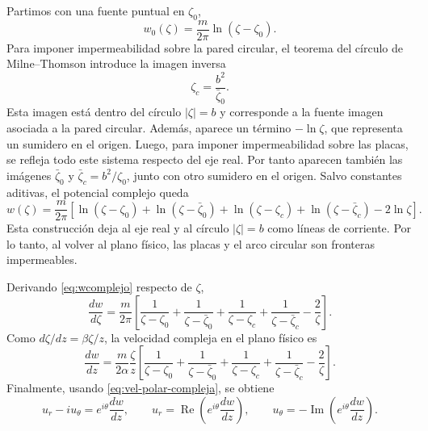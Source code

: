 \documentclass[11pt]{article}
\begin{document}
Partimos con una fuente puntual en $\zeta_0$,
\[
w_0(\zeta)=\frac{m}{2\pi}\ln(\zeta-\zeta_0).
\]
Para imponer impermeabilidad sobre la pared circular, el teorema del círculo de Milne--Thomson introduce la imagen inversa
\begin{equation}
\zeta_c=\frac{b^2}{\bar\zeta_0}.
\label{eq:imagen-circular-p3}
\end{equation}
Esta imagen está dentro del círculo $|\zeta|=b$ y corresponde a la fuente imagen asociada a la pared circular. Además, aparece un término $-\ln\zeta$, que representa un sumidero en el origen. Luego, para imponer impermeabilidad sobre las placas, se refleja todo este sistema respecto del eje real. Por tanto aparecen también las imágenes $\bar\zeta_0$ y $\bar\zeta_c=b^2/\zeta_0$, junto con otro sumidero en el origen. Salvo constantes aditivas, el potencial complejo queda
\begin{equation}
w(\zeta)=\frac{m}{2\pi}\left[
\ln(\zeta-\zeta_0)+\ln(\zeta-\bar\zeta_0)
+\ln(\zeta-\zeta_c)+\ln(\zeta-\bar\zeta_c)
-2\ln\zeta\right].
\label{eq:wcomplejo}
\end{equation}
Esta construcción deja al eje real y al círculo $|\zeta|=b$ como líneas de corriente. Por lo tanto, al volver al plano físico, las placas y el arco circular son fronteras impermeables.

Derivando \eqref{eq:wcomplejo} respecto de $\zeta$,
\begin{equation}
\frac{dw}{d\zeta}=
\frac{m}{2\pi}\left[
\frac1{\zeta-\zeta_0}+\frac1{\zeta-\bar\zeta_0}
+\frac1{\zeta-\zeta_c}+\frac1{\zeta-\bar\zeta_c}
-\frac2\zeta\right].
\label{eq:vel-zeta-p3}
\end{equation}
Como $d\zeta/dz=\beta\zeta/z$, la velocidad compleja en el plano físico es
\begin{equation}
\frac{dw}{dz}=
\frac{m}{2\alpha}\frac{\zeta}{z}\left[
\frac1{\zeta-\zeta_0}+\frac1{\zeta-\bar\zeta_0}
+\frac1{\zeta-\zeta_c}+\frac1{\zeta-\bar\zeta_c}
-\frac2\zeta\right].
\label{eq:vel-compleja-p3}
\end{equation}
Finalmente, usando \eqref{eq:vel-polar-compleja}, se obtiene
\begin{equation}
u_r-iu_\theta=e^{i\theta}\frac{dw}{dz},
\qquad
u_r=\operatorname{Re}\left(e^{i\theta}\frac{dw}{dz}\right),
\qquad
u_\theta=-\operatorname{Im}\left(e^{i\theta}\frac{dw}{dz}\right).
\label{eq:componentes-complejas-p3}
\end{equation}
\end{document}
